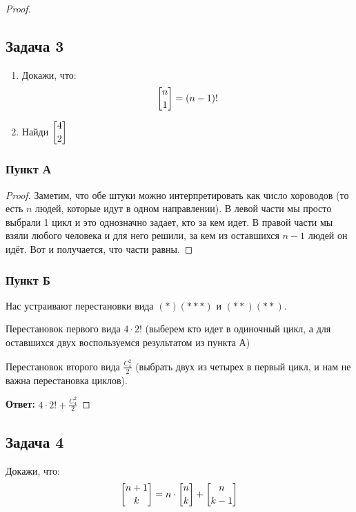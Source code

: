 \begin{proof}
\subsection{Задача 3} 

\begin{enumerate}
\item Докажи, что: $$\stirling{n}{1} = (n-1)!$$
\item Найди $\displaystyle \stirling{4}{2}$
\end{enumerate}

\subsubsection{Пункт А}

\begin{proof}
Заметим, что обе штуки можно интерпретировать как число хороводов (то есть $n$ людей, которые идут в одном направлении). В левой части мы просто выбрали 1 цикл и это однозначно задает, кто за кем идет. В правой части мы взяли любого человека и для него решили, за кем из оставшихся $n - 1$ людей он идёт. Вот и получается, что части равны.
\end{proof}

\subsubsection{Пункт Б}

Нас устраивают перестановки вида $(*)(***)$ и $(**)(**)$.

Перестановок первого вида $4 \cdot 2!$ (выберем кто идет в одиночный цикл, а для оставшихся двух воспользуемся результатом из пункта А)

Перестановок второго вида $\frac{C^2_{4}}{2}$ (выбрать двух из четырех в первый цикл, и нам не важна перестановка циклов).

\textbf{Ответ:} $4 \cdot 2! + \frac{C^2_{4}}{2}$

\end{proof}

\subsection{Задача 4}

Докажи, что:
\[
\stirling{n+1}{k} = n \cdot \stirling{n}{k} + \stirling{n}{k-1}
\]

